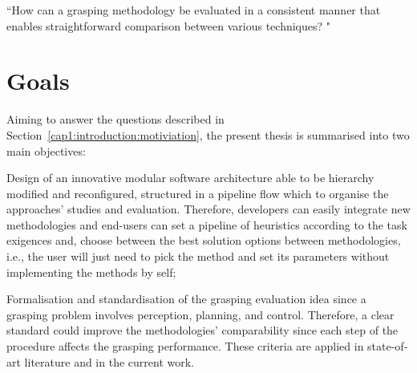 \begin{flushright}

``How can a grasping methodology be evaluated in a consistent manner that enables straightforward comparison between various techniques? "
\end{flushright}



\section{Goals}

Aiming to answer the questions described in Section~\ref{cap1:introduction:motiviation}, the present thesis is summarised into two main objectives:


\begin{itemize_jp}

    \item Design of an innovative modular software architecture able to be hierarchy modified and reconfigured, structured in a pipeline flow which to organise the approaches' studies and evaluation. Therefore, developers can easily integrate new methodologies and end-users can set a pipeline of heuristics according to the task exigences and, choose between the best solution options between methodologies, i.e., the user will just need to pick the method and set its parameters without implementing the methods by self; 

    \item Formalisation and standardisation of the grasping evaluation idea since a grasping problem involves perception, planning, and control. Therefore, a clear standard could improve the methodologies' comparability since each step of the procedure affects the grasping performance. These criteria are applied in state-of-art literature and in the current work.

    
\end{itemize_jp}

